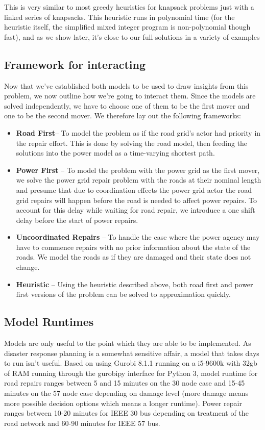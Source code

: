 \documentclass{article}
\begin{document}
	This is very similar to most greedy heuristics for knapsack problems just with a linked series of knapsacks. This heuristic runs in polynomial time (for the heuristic itself, the simplified mixed integer program is non-polynomial though fast), and as we show later, it's close to our full solutions in a variety of examples
	
	\subsection{Framework for interacting}
	Now that we've established both models to be used to draw insights from this problem, we now outline how we're going to interact them. Since the models are solved independently, we have to choose one of them to be the first mover and one to be the second mover. We therefore lay out the following frameworks:
	\begin{itemize}
		\item \textbf{Road First}-- To model the problem as if the road grid's actor had priority in the repair effort. This is done by solving the road model, then feeding the solutions into the power model as a time-varying shortest path.
		\item \textbf{Power First} -- To model the problem with the power grid as the first mover, we solve the power grid repair problem with the roads at their nominal length and presume that due to coordination effects the power grid actor the road grid repairs will happen before the road is needed to affect power repairs. To account for this delay while waiting for road repair, we introduce a one shift delay before the start of power repairs.
		\item \textbf{Uncoordinated Repairs} -- To handle the case where the power agency may have to commence repairs with no prior information about the state of the roads. We model the roads as if they are damaged and their state does not change.
		\item \textbf{Heuristic} -- Using the heuristic described above, both road first and power first versions of the problem can be solved to approximation quickly.
	\end{itemize}
	\subsection{Model Runtimes}
	Models are only useful to the point which they are able to be implemented. As disaster response planning is a somewhat sensitive affair, a model that takes days to run isn't useful. Based on using Gurobi 8.1.1 running on a i5-9600k with 32gb of RAM running through the gurobipy interface for Python 3, model runtime for road repairs ranges between 5 and 15 minutes on the 30 node case and 15-45 minutes on the 57 node case depending on damage level (more damage means more possible decision options which means a longer runtime). Power repair ranges between 10-20 minutes for IEEE 30 bus depending on treatment of the road network and 60-90 minutes for IEEE 57 bus.
\end{document}
